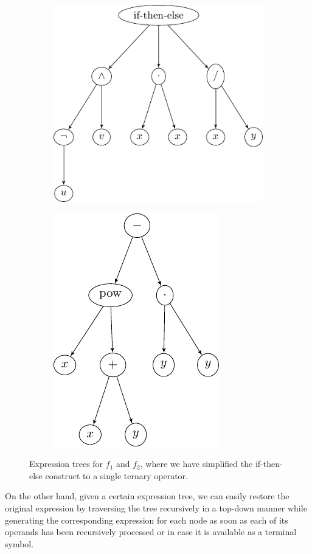 \begin{figure}
	\begin{subfigure}{0.59\textwidth}
		\includegraphics{figures/trees/gp_expression_tree1.pdf}
	\end{subfigure}
	\begin{subfigure}{0.41\textwidth}
		\includegraphics{figures/trees/gp_expression_tree2.pdf}
	\end{subfigure}
 \caption{Expression trees for $f_1$ and $f_2$, where we have simplified the if-then-else construct to a single ternary operator.}
 \label{fig:gp-expression-tree-examples}
\end{figure}
On the other hand, given a certain expression tree, we can easily restore the original expression by traversing the tree recursively in a top-down manner while generating the corresponding expression for each node as soon as each of its operands has been recursively processed or in case it is available as a terminal symbol.
